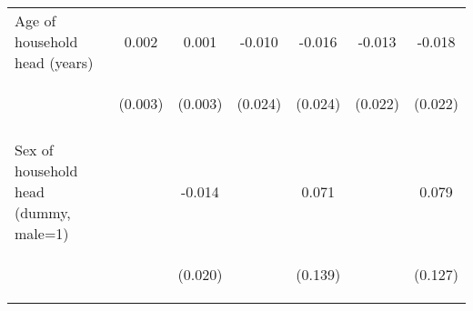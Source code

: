 \begin{center}
\begin{tabular}{lcccccc}
Age of household head (years) & 0.002 & 0.001 & -0.010 & -0.016 & -0.013 & -0.018 \\
 & \begin{footnotesize}(0.003)\end{footnotesize} & \begin{footnotesize}(0.003)\end{footnotesize} & \begin{footnotesize}(0.024)\end{footnotesize} & \begin{footnotesize}(0.024)\end{footnotesize} & \begin{footnotesize}(0.022)\end{footnotesize} & \begin{footnotesize}(0.022)\end{footnotesize} \\
\vspace{4pt} & \begin{footnotesize}[0.539]\end{footnotesize} & \begin{footnotesize}[0.701]\end{footnotesize} & \begin{footnotesize}[0.660]\end{footnotesize} & \begin{footnotesize}[0.490]\end{footnotesize} & \begin{footnotesize}[0.565]\end{footnotesize} & \begin{footnotesize}[0.409]\end{footnotesize} \\
Sex of household head (dummy, male=1) &  & -0.014 &  & 0.071 &  & 0.079 \\
 & \begin{footnotesize}\end{footnotesize} & \begin{footnotesize}(0.020)\end{footnotesize} & \begin{footnotesize}\end{footnotesize} & \begin{footnotesize}(0.139)\end{footnotesize} & \begin{footnotesize}\end{footnotesize} & \begin{footnotesize}(0.127)\end{footnotesize} \\

\end{tabular}
\end{center}
